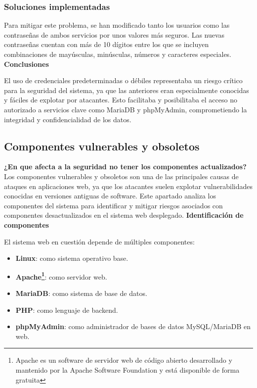 \documentclass[a4paper,12pt]{article}
\begin{document}
\subsubsection{Soluciones implementadas}
Para mitigar este problema, se han modificado tanto los usuarios como las contraseñas de ambos servicios por unos valores más seguros. Las nuevas contraseñas cuentan con más de 10 dígitos entre los que se incluyen combinaciones de mayúsculas, minúsculas, números y caracteres especiales.\\

\textbf{Conclusiones}

El uso de credenciales predeterminadas o débiles representaba un riesgo crítico para la seguridad del sistema, ya que las anteriores eran especialmente conocidas y fáciles de explotar por atacantes. Esto facilitaba y posibilitaba el acceso no autorizado a servicios clave como MariaDB y phpMyAdmin, comprometiendo la integridad y confidencialidad de los datos. 



\subsection{Componentes vulnerables y obsoletos}
\vspace{1em}
\textbf{¿En que afecta a la seguridad no tener los componentes actualizados?\\}
Los componentes vulnerables y obsoletos son una de las principales causas de ataques en aplicaciones web, ya que los atacantes suelen explotar vulnerabilidades conocidas en versiones antiguas de software. Este apartado analiza los componentes del sistema para identificar y mitigar riesgos asociados con componentes desactualizados en el sistema web desplegado.
\vspace{1em}
\newpage
\textbf{Identificación de componentes}\vspace{1em}

El sistema web en cuestión depende de múltiples componentes:
\begin{itemize}
	\item \textbf{Linux}: como sistema operativo base.
	\item \textbf{Apache\footnote{Apache es un software de servidor web de código abierto desarrollado y mantenido por la Apache Software Foundation y está disponible de forma gratuita}}: como servidor web.
	\item \textbf{MariaDB}: como sistema de base de datos.
	\item \textbf{PHP}: como lenguaje de backend.
	\item \textbf{phpMyAdmin}: como administrador de bases de datos MySQL/MariaDB en web.
\end{itemize}
\end{document}
